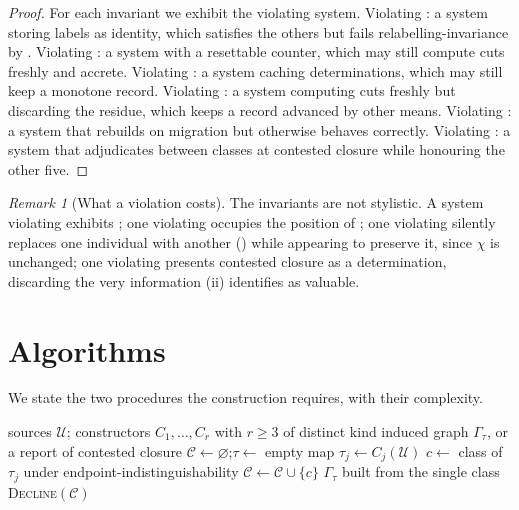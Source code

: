 \documentclass[11pt,twocolumn,a4paper]{article}
\theoremstyle{dirthm}
\theoremstyle{definition}
\theoremstyle{remark}
\newtheorem{remark}[theorem]{Remark}
\newcommand{\Gph}{\Gamma}
\newcommand{\Char}{\chi}
\newcommand{\Cell}{\mathcal{C}}
\newcommand{\terms}{\tau}
\newcommand{\abs}[1]{\lvert#1\rvert}
\newcommand{\set}[1]{\{#1\}}
\begin{document}
\begin{proof}
For each invariant we exhibit the violating system. Violating
: a system storing labels as identity, which satisfies the
others but fails relabelling-invariance by . Violating
: a system with a resettable counter, which may still compute
cuts freshly and accrete. Violating : a system caching
determinations, which may still keep a monotone record. Violating
: a system computing cuts freshly but discarding the
residue, which keeps a record advanced by other means. Violating
: a system that rebuilds on migration but otherwise
behaves correctly. Violating : a system that adjudicates
between classes at contested closure while honouring the other five.
\end{proof}

\begin{remark}[What a violation costs]
\label{rem:violation-cost}
The invariants are not stylistic. A system violating 
exhibits ; one violating  occupies the
position of ; one violating
 silently replaces one individual with another
() while appearing to preserve it, since $\Char$ is
unchanged; one violating  presents contested closure as
a determination, discarding the very information (ii)
identifies as valuable.
\end{remark}

\section{Algorithms}
\label{sec:algorithms}

We state the two procedures the construction requires, with their complexity.

\begin{algorithm}[H]
\caption{Construction to closure}
\label{alg:construct}
\begin{algorithmic}[1]
\Require sources $\mathcal{U}$; constructors $C_1,\dots,C_r$ with $r\ge3$ of
distinct kind
\Ensure induced graph $\Gph_\terms$, or a report of contested closure
\State $\Cell\gets\varnothing$;\quad $\terms\gets$ empty map
\Repeat
    \State $\terms_j\gets C_j(\mathcal{U})$
    \State $c\gets$ class of $\terms_j$ under
           endpoint-indistinguishability
    \If{$c\notin\Cell$} \State $\Cell\gets\Cell\cup\set{c}$ \EndIf
  \EndFor
\Until{no constructor adds a class to $\Cell$}
\If{$\abs{\Cell}=1$}
  \State \Return $\Gph_\terms$ built from the single class
\Else
  \State \Return \textsc{Decline}$(\Cell)$
\EndIf
\end{algorithmic}
\end{algorithm}
\end{document}
